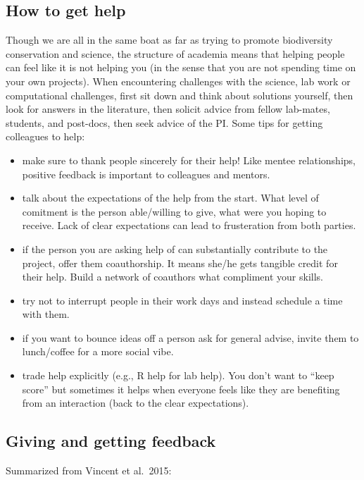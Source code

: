 \documentclass[12pt]{article}
\begin{document}
\subsection{How to get help}
\label{sec:help}
Though we are all in the same boat as far as trying to promote
biodiversity conservation and science, the structure of academia means
that helping people can feel like it is not helping you (in the sense
that you are not spending time on your own projects). When
encountering challenges with the science, lab work or computational
challenges, first sit down and think about solutions yourself, then
look for answers in the literature, then solicit advice from fellow
lab-mates, students, and post-docs, then seek advice of the PI. Some
tips for getting colleagues to help:
\begin{itemize}
\item make sure to thank people sincerely for their help! Like mentee
  relationships, positive feedback is important to colleagues and
  mentors.
  \item talk about the expectations of the help from the start. What
    level of comitment is the person able/willing to give, what were
    you hoping to receive. Lack of clear expectations can lead to
    frusteration from both parties.
\item if the person you are asking help of can substantially
  contribute to the project, offer them coauthorship. It means
  she/he gets tangible credit for their help. Build a network of
  coauthors what compliment your skills.
\item try not to interrupt people in their work days and instead
  schedule a time with them.
\item if you want to bounce ideas off a person ask for general advise,
  invite them to lunch/coffee for a more social vibe.
\item trade help explicitly (e.g., R help for lab help). You don't
  want to ``keep score'' but sometimes it helps when everyone feels
  like they are benefiting from an interaction (back to the clear
  expectations).
\end{itemize}

\subsection{Giving and getting feedback}
Summarized from Vincent et al.~2015:
\end{document}
